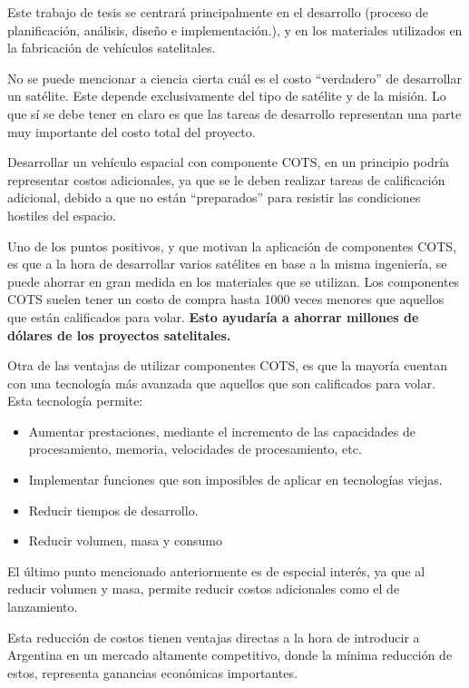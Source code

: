 Este trabajo de tesis se centrará principalmente en el desarrollo (proceso de planificación, 
análisis, diseño e implementación.), y en los materiales utilizados en la fabricación de vehículos satelitales.

No se puede mencionar a ciencia cierta cuál es el costo “verdadero” de desarrollar un satélite. Este 
depende exclusivamente del tipo de satélite y de la misión. Lo que sí se debe tener en claro es que 
las tareas de desarrollo representan una parte muy importante del costo total del proyecto.

Desarrollar un vehículo espacial con componente \ac{COTS}, en un principio podría representar costos 
adicionales, ya que se le deben realizar tareas de calificación adicional, debido a que no están 
“preparados” para resistir las condiciones hostiles del espacio. 

Uno de los puntos positivos, y que motivan la aplicación de componentes COTS, es que a la hora de 
desarrollar varios satélites en base a la misma ingeniería, se puede ahorrar en gran medida en los 
materiales que se utilizan. Los componentes \ac{COTS} suelen tener un costo de compra hasta 1000 
veces menores que aquellos que están calificados para volar. \textbf{Esto ayudaría a ahorrar 
 millones de dólares de los proyectos satelitales.}
  
Otra de las ventajas de utilizar componentes \ac{COTS}, es que la mayoría cuentan con una tecnología más 
avanzada que aquellos que son calificados para volar. Esta tecnología permite:
\begin{itemize}
 \item Aumentar prestaciones, mediante el incremento de las capacidades de procesamiento, memoria, 
velocidades de 
procesamiento, etc.
 \item Implementar funciones que son imposibles de aplicar en tecnologías viejas.
 \item Reducir tiempos de desarrollo.
 \item Reducir volumen, masa y consumo
\end{itemize}

El último punto mencionado anteriormente es de especial interés, ya que al reducir volumen y masa, 
permite reducir costos adicionales como el de lanzamiento.

Esta reducción de costos tienen ventajas directas a la hora de introducir a 
Argentina en un mercado altamente competitivo, donde la mínima reducción de estos, representa 
ganancias económicas importantes. 
 
